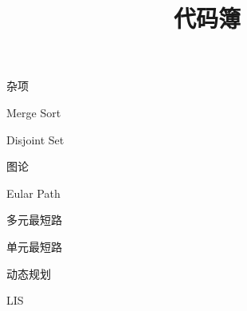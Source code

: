 \documentclass{article}
\title{代码簿}
\begin{document}
\maketitle

\begin{enumerate}

{\bf \LARGE \item  杂项}

	\begin{itemize}

	{\bf \item  Merge Sort}
	

	{\bf \item  Disjoint Set}
	

	\end{itemize}

{\bf \LARGE \item  图论}


	\begin{itemize}
	
	{\bf \item  Eular Path}	
	
	
	{\bf \item  多元最短路}
		
	
	{\bf \item  单元最短路}
		
	
	\end{itemize}

{\bf \LARGE \item  动态规划}

	\begin{itemize}
	
	{\bf \item  LIS}
		
	
		
	
	\end{itemize}


\end{enumerate}
\end{document}

